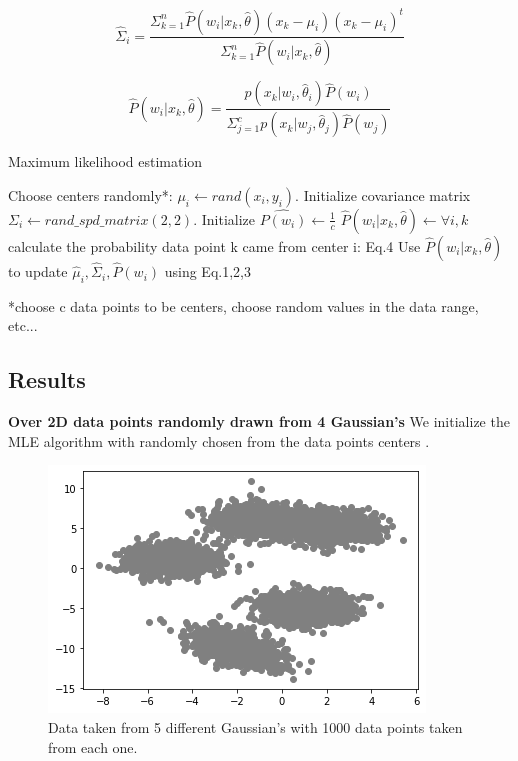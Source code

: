 \documentclass[12pt, a4paper]{paper}
\begin{document}
\begin{equation}
\hat{\Sigma}_{i} = \frac
{\Sigma_{k=1}^n \hat{P}(w_{i}|x_{k}, \hat{\theta})(x_{k}-\mu_{i})(x_{k}-\mu_{i})^{t}}
{\Sigma_{k=1}^n \hat{P}(w_{i}|x_{k}, \hat{\theta})} 
\end{equation}


\begin{equation}
\hat{P}(w_{i}|x_{k}, \hat{\theta}) = \frac
{p(x_{k}|w_{i},\hat{\theta}_{i})\hat{P}(w_{i})}
{\Sigma_{j=1}^{c} p(x_{k}|w_{j},\hat{\theta}_{j})\hat{P}(w_{j})} 
\end{equation}

\newpage


\begin{algorithm}
{\fontsize{10pt}{10pt}\selectfont
\caption{Maximum likelihood estimation}\label{alg:BrothForce}
\begin{algorithmic}[1]
\State Choose centers randomly*: $\mu_{i} \gets rand(x_{i}, y_{i})$.
\State Initialize covariance matrix  $\Sigma_{i} \gets rand\_spd\_matrix(2,2)$.
\State Initialize $\hat{P(w_{i})} \gets \frac{1}{c}$ 
\State $\hat{P}(w_{i}|x_{k}, \hat{\theta}) \gets \forall i,k$ calculate the probability data point k came from center i: Eq.4 
\State Use $\hat{P}(w_{i}|x_{k}, \hat{\theta})$ to update $\hat{\mu}_{i}, \hat{\Sigma}_{i}, \hat{P}(w_{i})$ using Eq.1,2,3
\EndWhile 
\end{algorithmic}
}
\end{algorithm} 
*choose c data points to be centers, choose random values in the data range, etc... 

\subsection*{Results}
\textbf{Over 2D data points randomly drawn from 4 Gaussian's}
We initialize the MLE algorithm with randomly chosen from the data points centers .

\begin{figure}[h!]
\centering
\includegraphics[scale=0.6]{MLE_2D_init.png}
\caption{Data taken from 5 different Gaussian's with 1000 data points taken from each one.}
\label{fig:MLE_1}
\end{figure}
\end{document}
